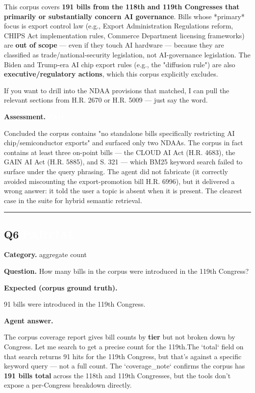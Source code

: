\documentclass[11pt]{article}
\newcommand{\fieldlabel}[1]{\textbf{\color{navy}#1}\quad}
\begin{document}
This corpus covers \textbf{191 bills from the 118th and 119th Congresses that primarily or substantially concern AI governance}. Bills whose *primary* focus is export control law (e.g., Export Administration Regulations reform, CHIPS Act implementation rules, Commerce Department licensing frameworks) are \textbf{out of scope} --- even if they touch AI hardware --- because they are classified as trade/national-security legislation, not AI-governance legislation. The Biden and Trump-era AI chip export rules (e.g., the "diffusion rule") are also \textbf{executive/regulatory actions}, which this corpus explicitly excludes.

If you want to drill into the NDAA provisions that matched, I can pull the relevant sections from H.R. 2670 or H.R. 5009 --- just say the word.

\fieldlabel{Assessment.} \colorbox{failred}{\textcolor{white}{\bfseries FAIL}}\par
Concluded the corpus contains "no standalone bills specifically restricting AI chip/semiconductor exports" and surfaced only two NDAAs. The corpus in fact contains at least three on-point bills --- the CLOUD AI Act (H.R. 4683), the GAIN AI Act (H.R. 5885), and S. 321 --- which BM25 keyword search failed to surface under the query phrasing. The agent did not fabricate (it correctly avoided miscounting the export-promotion bill H.R. 6996), but it delivered a wrong answer: it told the user a topic is absent when it is present. The clearest case in the suite for hybrid semantic retrieval.
\vspace{4pt}\hrule\vspace{8pt}
\subsection*{Q6 \quad \colorbox{partialorange}{\textcolor{white}{\bfseries PARTIAL}}}
\fieldlabel{Category.} aggregate count\par
\fieldlabel{Question.} How many bills in the corpus were introduced in the 119th Congress?\par
\fieldlabel{Expected (corpus ground truth).}\par
91 bills were introduced in the 119th Congress.

\fieldlabel{Agent answer.}\par
The corpus coverage report gives bill counts by \textbf{tier} but not broken down by Congress. Let me search to get a precise count for the 119th.The `total` field on that search returns 91 hits for the 119th Congress, but that's against a specific keyword query --- not a full count. The `coverage\_note` confirms the corpus has \textbf{191 bills total} across the 118th and 119th Congresses, but the tools don't expose a per-Congress breakdown directly.
\end{document}
